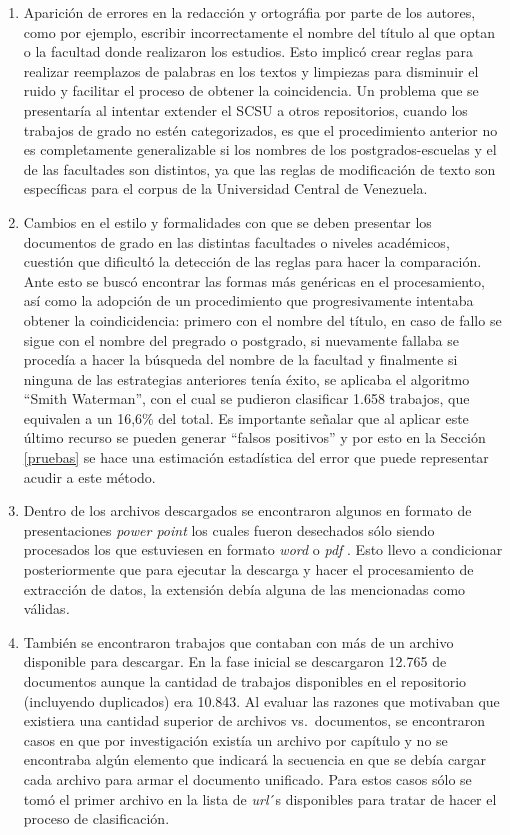 \documentclass[
  12pt,
  openany]{book}
\begin{document}
\begin{enumerate}
\def\labelenumi{\arabic{enumi}.}
\item
  Aparición de errores en la redacción y ortográfia por parte de los autores, como por ejemplo, escribir incorrectamente el nombre del título al que optan o la facultad donde realizaron los estudios. Esto implicó crear reglas para realizar reemplazos de palabras en los textos y limpiezas para disminuir el ruido y facilitar el proceso de obtener la coincidencia. Un problema que se presentaría al intentar extender el SCSU a otros repositorios, cuando los trabajos de grado no estén categorizados, es que el procedimiento anterior no es completamente generalizable si los nombres de los postgrados-escuelas y el de las facultades son distintos, ya que las reglas de modificación de texto son específicas para el corpus de la Universidad Central de Venezuela.
\item
  Cambios en el estilo y formalidades con que se deben presentar los documentos de grado en las distintas facultades o niveles académicos, cuestión que dificultó la detección de las reglas para hacer la comparación. Ante esto se buscó encontrar las formas más genéricas en el procesamiento, así como la adopción de un procedimiento que progresivamente intentaba obtener la coindicidencia: primero con el nombre del título, en caso de fallo se sigue con el nombre del pregrado o postgrado, si nuevamente fallaba se procedía a hacer la búsqueda del nombre de la facultad y finalmente si ninguna de las estrategias anteriores tenía éxito, se aplicaba el algoritmo ``Smith Waterman'', con el cual se pudieron clasificar 1.658 trabajos, que equivalen a un 16,6\% del total. Es importante señalar que al aplicar este último recurso se pueden generar ``falsos positivos'' y por esto en la Sección \ref{pruebas} se hace una estimación estadística del error que puede representar acudir a este método.
\item
  Dentro de los archivos descargados se encontraron algunos en formato de presentaciones \emph{power point} los cuales fueron desechados sólo siendo procesados los que estuviesen en formato \emph{word} o \emph{pdf} . Esto llevo a condicionar posteriormente que para ejecutar la descarga y hacer el procesamiento de extracción de datos, la extensión debía alguna de las mencionadas como válidas\emph{.}
\item
  También se encontraron trabajos que contaban con más de un archivo disponible para descargar. En la fase inicial se descargaron 12.765 de documentos aunque la cantidad de trabajos disponibles en el repositorio (incluyendo duplicados) era 10.843. Al evaluar las razones que motivaban que existiera una cantidad superior de archivos vs.~documentos, se encontraron casos en que por investigación existía un archivo por capítulo y no se encontraba algún elemento que indicará la secuencia en que se debía cargar cada archivo para armar el documento unificado. Para estos casos sólo se tomó el primer archivo en la lista de \emph{url}´s disponibles para tratar de hacer el proceso de clasificación.

\end{enumerate}
\end{document}
